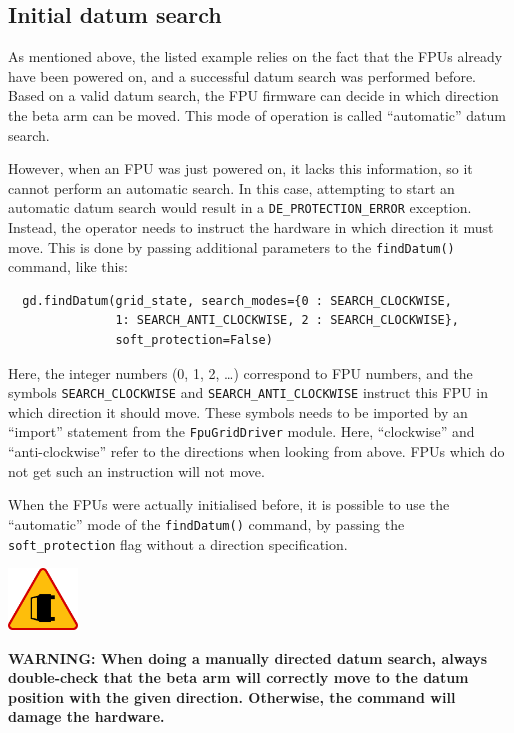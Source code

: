 \documentclass[11pt,a4paper]{scrartcl}
\newenvironment{warning}{\begin{framed}\includegraphics[width=5em]{accident-area-ahead.png}
}{\end{framed}}
\begin{document}
\subsection{Initial datum search}
\label{sec:initialsearch}
  As
mentioned above, the listed example relies on the fact that the FPUs
already have been powered on, and a successful datum search was
performed before. Based on a valid datum search, the FPU firmware can
decide in which direction the beta arm can be moved. This mode of
operation is called ``automatic'' datum search.

However, when an FPU was just powered on, it lacks this information,
so it cannot perform an automatic search. In this case, attempting to
start an automatic datum search would result in a
\texttt{DE\_PROTECTION\_ERROR} exception. Instead, the operator needs
to instruct the hardware in which direction it must move. This is done
by passing additional parameters to the \texttt{findDatum()} command,
like this:


\begin{verbatim}
  gd.findDatum(grid_state, search_modes={0 : SEARCH_CLOCKWISE,
               1: SEARCH_ANTI_CLOCKWISE, 2 : SEARCH_CLOCKWISE},
               soft_protection=False)
\end{verbatim}

Here, the integer numbers (0, 1, 2, \ldots) correspond to FPU numbers,
and the symbols \texttt{SEARCH\_CLOCKWISE} and
\texttt{SEARCH\_ANTI\_CLOCKWISE} instruct this FPU in which direction
it should move. These symbols needs to be imported by an ``import''
statement from the \texttt{FpuGridDriver} module.  Here, ``clockwise''
and ``anti-clockwise'' refer to the directions when looking from
above. FPUs which do not get such an instruction will not move. 


When the FPUs were actually initialised before, it is possible to use
the ``automatic'' mode of the \texttt{findDatum()} command, by passing
the \texttt{soft\_protection} flag without a direction specification.

\begin{warning}
  \textbf{WARNING: When doing a manually directed datum search, always
    double-check that the beta arm will correctly move to the datum
    position with the given direction. Otherwise, the command will
    damage the hardware.}
\end{warning}
\end{document}
